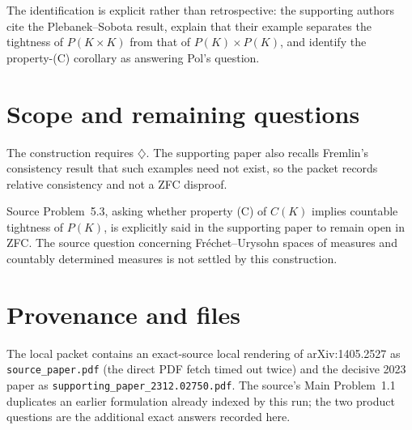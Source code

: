 \documentclass[11pt]{article}
\newcommand{\PK}{P(K)}
\begin{document}
The identification is explicit rather than retrospective: the supporting
authors cite the Plebanek--Sobota result, explain that their example separates
the tightness of \(P(K\times K)\) from that of \(\PK\times\PK\), and identify
the property-(C) corollary as answering Pol's question.

\section*{Scope and remaining questions}

The construction requires \(\diamondsuit\).  The supporting paper also recalls
Fremlin's consistency result that such examples need not exist, so the packet
records relative consistency and not a ZFC disproof.

Source Problem~5.3, asking whether property (C) of \(C(K)\) implies countable
tightness of \(\PK\), is explicitly said in the supporting paper to remain
open in ZFC.  The source question concerning Fr\'echet--Urysohn spaces of
measures and countably determined measures is not settled by this construction.

\section*{Provenance and files}

The local packet contains an exact-source local rendering of arXiv:1405.2527
as \texttt{source\_paper.pdf} (the direct PDF fetch timed out twice) and the
decisive 2023 paper as
\texttt{supporting\_paper\_2312.02750.pdf}.  The source's Main Problem~1.1
duplicates an earlier formulation already indexed by this run; the two product
questions are the additional exact answers recorded here.
\end{document}
